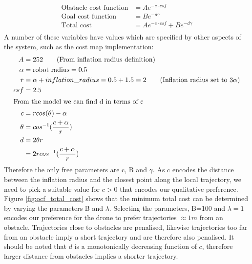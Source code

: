 \documentclass[capstone_report.tex]{subfiles}
\begin{document}
\begin{align*}
    \text{Obstacle cost function} &=  Ae^{-c\cdot csf}\\
    \text{Goal cost function} &=    Be^{-d\gamma}\\
    \text{Total cost} &=  Ae^{-c\cdot csf} + Be^{-d\gamma}\\
    \end{align*}
A number of these variables have values which are specified by other aspects of the system, such as the cost map implementation:
\begin{align*}
    A &=    252 \tag{\text{From inflation radius definition}}\\
    \alpha &=    \text{robot radius} = 0.5\\
    r &=    \alpha + inflation\_radius = 0.5 + 1.5 = 2\tag{\text{Inflation radius set to 3$\alpha$}}\\
    csf &= 2.5\\
    \intertext{From the model we can find d in terms of c}
    c   &=    rcos(\theta) - \alpha\\
    \theta &=   cos^{-1}(\frac{c+\alpha}{r})\\
    d   &=    2\theta r\\
        &=    2rcos^{-1}(\frac{c+\alpha}{r})\\
\end{align*}
Therefore the only free parameters are c, B and $\gamma$.  As c encodes the distance between the inflation radius and the closest point along the local trajectory, we need to pick a suitable value for $c>0$ that encodes our qualitative preference.  Figure \ref{fig:ocf_total_cost} shows that the minimum total cost can be determined by varying the parameters B and $\lambda$.  Selecting the parameters, B=100 and $\lambda=1$ encodes our preference for the drone to prefer trajectories $\approx 1m$ from an obstacle.  Trajectories close to obstacles are penalised, likewise trajectories too far from an obstacle imply a short trajectory and are therefore also penalised.  It should be noted that $d$ is a monotonically decreasing function of $c$, therefore larger distance from obstacles implies a shorter trajectory.
\end{document}
